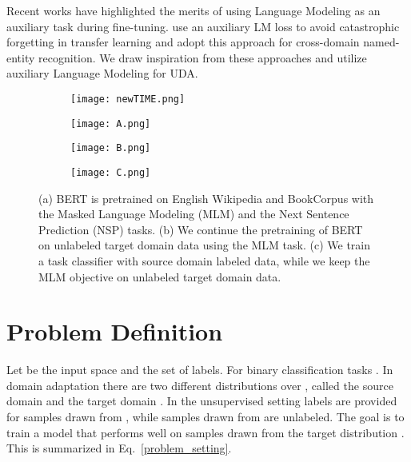 \documentclass[11pt]{article}
\begin{document}
Recent works have highlighted the merits of using Language Modeling as an auxiliary task during fine-tuning. \citet{chronopoulou-etal-2019-embarrassingly} use an auxiliary LM loss to avoid catastrophic forgetting in transfer learning and \citet{jia-etal-2019-cross} adopt this approach for cross-domain named-entity recognition. We draw inspiration from these approaches and utilize auxiliary Language Modeling for UDA.

\begin{figure*}
\centering
\begin{subfigure}[t]{0.84\textwidth}
\centering
\texttt{[image: newTIME.png]}
\end{subfigure}
\begin{subfigure}[t]{0.27\textwidth}
\centering
\texttt{[image: A.png]}
\caption{}
\label{fig:GPT}
\end{subfigure}
\begin{subfigure}[t]{0.27\textwidth}
\centering
\texttt{[image: B.png]}
\caption{}
\label{fig:DPT}
\end{subfigure}
\begin{subfigure}[t]{0.3\textwidth}
\centering
\texttt{[image: C.png]}
\caption{}
\label{fig:FT}
\end{subfigure}
    
    \caption{(a) BERT \citep{devlin-etal-2019-bert} is pretrained on English Wikipedia and BookCorpus with the Masked Language Modeling (MLM) and the Next Sentence Prediction (NSP) tasks. (b) We continue the pretraining of BERT on unlabeled target domain data using the MLM task. (c) We train a task classifier with source domain labeled data, while we keep the MLM objective on unlabeled target domain data.}
    \label{fig:figure}
\end{figure*}

\section{Problem Definition}
Let  be the input space and  the set of labels. For binary classification tasks . In domain adaptation there are two different distributions over , called the source domain  and the target domain . In the unsupervised setting labels are provided for samples drawn from , while samples drawn from  are unlabeled. The goal is to train a model that performs well on samples drawn from the target distribution . This is summarized in Eq.~\ref{problem_setting}. 
\end{document}

